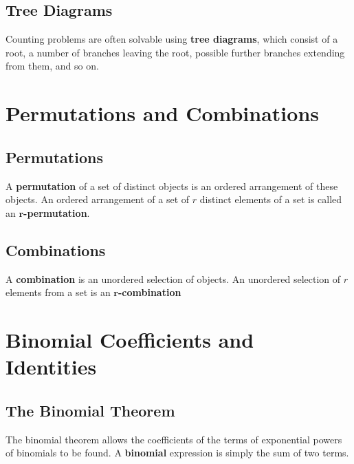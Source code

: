 \documentclass[./Discrete Math.tex]{subfiles}
\begin{document}
		\subsection{Tree Diagrams}
			Counting problems are often solvable using \textbf{tree diagrams}, which consist of a root, a number of branches leaving the root, possible further branches extending from them, and so on.
	\setcounter{section}{2}
	\section{Permutations and Combinations}
		\setcounter{subsection}{1}
		\subsection{Permutations}
			A \textbf{permutation} of a set of distinct objects is an ordered arrangement of these objects. An ordered arrangement of a set of \(r\) distinct elements of a set is called an \textbf{\(\bm{r}\)-permutation}.
		\subsection{Combinations}
			A \textbf{combination} is an unordered selection of objects. An unordered selection of \(r\) elements from a set is an \textbf{\(\bm{r}\)-combination}
	\section{Binomial Coefficients and Identities}
		\setcounter{subsection}{1}
		\subsection{The Binomial Theorem}
			The binomial theorem allows the coefficients of the terms of exponential powers of binomials to be found. A \textbf{binomial} expression is simply the sum of two terms.
\end{document}
